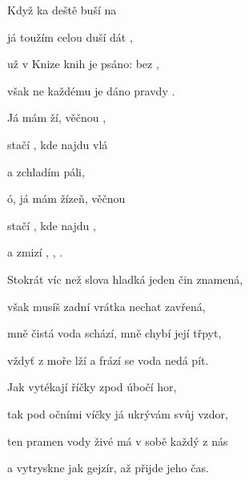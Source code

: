 

\zs
Když ka deště buší na  

já toužím celou duší dát  ,

už v Knize knih je psáno: bez   ,

však ne každému je dáno  pravdy .
\ks

\zr
Já mám ží, věčnou , 

stačí , kde najdu vlá

a zchladím  páli,

ó, já mám žízeň, věčnou 

stačí , kde najdu ,

a zmizí , , .
\kr

\zs
Stokrát víc než slova hladká jeden čin znamená,

však musíš zadní vrátka nechat zavřená,

mně čistá voda schází, mně chybí její třpyt,

vždyť z moře lží a frází se voda nedá pít.
\ks

\zr  \kr

\zs
Jak vytékají říčky zpod úbočí hor,

tak pod očními víčky já ukrývám svůj vzdor,

ten pramen vody živé má v sobě každý z nás

a vytryskne jak gejzír, až přijde jeho čas.
\ks

\zr  \kr  \zr  \kr

\kp
